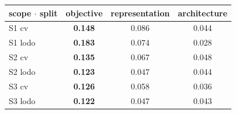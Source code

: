 \begin{tabular}{lccc}
\toprule
scope $\cdot$ split & objective & representation & architecture \\
\midrule
S1 cv & \textbf{0.148} & 0.086 & 0.044 \\
S1 lodo & \textbf{0.183} & 0.074 & 0.028 \\
S2 cv & \textbf{0.135} & 0.067 & 0.048 \\
S2 lodo & \textbf{0.123} & 0.047 & 0.044 \\
S3 cv & \textbf{0.126} & 0.058 & 0.036 \\
S3 lodo & \textbf{0.122} & 0.047 & 0.043 \\
\bottomrule
\end{tabular}
